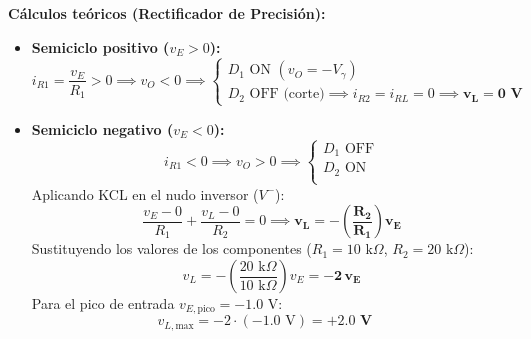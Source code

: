 \documentclass{article}
\begin{document}
	
	\textbf{Cálculos teóricos (Rectificador de Precisión):}
	
	\begin{itemize}
		\item \textbf{Semiciclo positivo ($v_E > 0$):}
		\[
		i_{R1} = \frac{v_E}{R_1} > 0 \implies v_O < 0 \implies 
		\begin{cases} 
			D_1 \text{ ON } (v_O = -V_\gamma) \\ 
			D_2 \text{ OFF (corte)} \implies i_{R2} = i_{RL} = 0 \implies \mathbf{v_L = 0\text{ V}} 
		\end{cases}
		\]
		
		\item \textbf{Semiciclo negativo ($v_E < 0$):}
		\[
		i_{R1} < 0 \implies v_O > 0 \implies 
		\begin{cases} 
			D_1 \text{ OFF} \\ 
			D_2 \text{ ON}  \\
		\end{cases}
		\]
		Aplicando KCL en el nudo inversor ($V^-$):
		\[
		\frac{v_E - 0}{R_1} + \frac{v_L - 0}{R_2} = 0 \implies \mathbf{v_L = -\left(\frac{R_2}{R_1}\right) v_E}
		\]
		Sustituyendo los valores de los componentes ($R_1 = 10\text{ k}\Omega$, $R_2 = 20\text{ k}\Omega$):
		\[
		v_L = -\left(\frac{20\text{ k}\Omega}{10\text{ k}\Omega}\right) v_E = \mathbf{-2\,v_E}
		\]
		Para el pico de entrada $v_{E,\text{pico}} = -1.0\text{ V}$:
		\[
		v_{L,\text{max}} = -2 \cdot (-1.0\text{ V}) = \mathbf{+2.0\text{ V}} \quad 
		\]
	\end{itemize}
	
\end{document}
